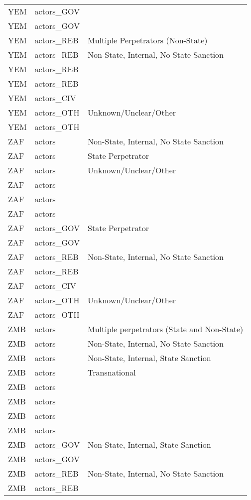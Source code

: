 \begin{table}[ht]
\begin{tabular}{lll}
  YEM & actors\_GOV &  \\ 
  YEM & actors\_GOV &  \\ 
  YEM & actors\_REB & Multiple Perpetrators (Non-State) \\ 
  YEM & actors\_REB & Non-State, Internal, No State Sanction \\ 
  YEM & actors\_REB &  \\ 
  YEM & actors\_REB &  \\ 
  YEM & actors\_CIV &  \\ 
  YEM & actors\_OTH & Unknown/Unclear/Other \\ 
  YEM & actors\_OTH &  \\ 
  ZAF & actors & Non-State, Internal, No State Sanction \\ 
  ZAF & actors & State Perpetrator \\ 
  ZAF & actors & Unknown/Unclear/Other \\ 
  ZAF & actors &  \\ 
  ZAF & actors &  \\ 
  ZAF & actors &  \\ 
  ZAF & actors\_GOV & State Perpetrator \\ 
  ZAF & actors\_GOV &  \\ 
  ZAF & actors\_REB & Non-State, Internal, No State Sanction \\ 
  ZAF & actors\_REB &  \\ 
  ZAF & actors\_CIV &  \\ 
  ZAF & actors\_OTH & Unknown/Unclear/Other \\ 
  ZAF & actors\_OTH &  \\ 
  ZMB & actors & Multiple perpetrators (State and Non-State) \\ 
  ZMB & actors & Non-State, Internal, No State Sanction \\ 
  ZMB & actors & Non-State, Internal, State Sanction \\ 
  ZMB & actors & Transnational \\ 
  ZMB & actors &  \\ 
  ZMB & actors &  \\ 
  ZMB & actors &  \\ 
  ZMB & actors &  \\ 
  ZMB & actors\_GOV & Non-State, Internal, State Sanction \\ 
  ZMB & actors\_GOV &  \\ 
  ZMB & actors\_REB & Non-State, Internal, No State Sanction \\ 
  ZMB & actors\_REB &  \\ 

\end{tabular}
\end{table}
